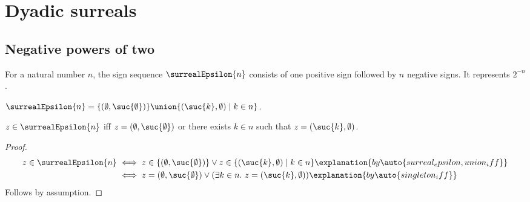 


\section{Dyadic surreals}

\subsection{Negative powers of two}

For a natural number $n$, the sign sequence $\surrealEpsilon{n}$ consists of
one positive sign followed by $n$ negative signs.  It represents $2^{-n}$.

\begin{definition}\label{surreal_epsilon}
    $\surrealEpsilon{n}=
        \{(\emptyset,\suc{\emptyset})\}
        \union
        \{(\suc{k},\emptyset)\mid k\in n\}$.
\end{definition}

\begin{proposition}\label{surreal_epsilon_iff}
    $z\in\surrealEpsilon{n}$ iff
        $z=(\emptyset,\suc{\emptyset})$ or
        there exists $k\in n$ such that $z=(\suc{k},\emptyset)$.
\end{proposition}
\begin{proof}
    \begin{align*}
        z\in\surrealEpsilon{n}
            &\iff
                z\in\{(\emptyset,\suc{\emptyset})\}\lor
                z\in\{(\suc{k},\emptyset)\mid k\in n\}
                \explanation{by \auto{surreal_epsilon,union_iff}}
            \\
            &\iff
                z=(\emptyset,\suc{\emptyset})\lor
                (\exists k\in n.\ z=(\suc{k},\emptyset))
                \explanation{by \auto{singleton_iff}}
    \end{align*}
    Follows by assumption.
\end{proof}

